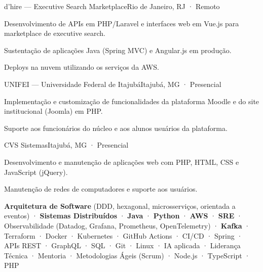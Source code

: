 \documentclass{resume}
\begin{document}
        {d'hire — Executive Search Marketplace}{Rio de Janeiro, RJ · Remoto}
\begin{cvitems}
  \item Desenvolvimento de APIs em PHP/Laravel e interfaces web em Vue.js para marketplace
        de executive search.
  \item Sustentação de aplicações Java (Spring MVC) e Angular.js em produção.
  \item Deploys na nuvem utilizando os serviços da AWS.
\end{cvitems}

        {UNIFEI — Universidade Federal de Itajubá}{Itajubá, MG · Presencial}
\begin{cvitems}
  \item Implementação e customização de funcionalidades da plataforma Moodle e do site
        institucional (Joomla) em PHP.
  \item Suporte aos funcionários do núcleo e aos alunos usuários da plataforma.
\end{cvitems}

        {CVS Sistemas}{Itajubá, MG · Presencial}
\begin{cvitems}
  \item Desenvolvimento e manutenção de aplicações web com PHP, HTML, CSS e JavaScript (jQuery).
  \item Manutenção de redes de computadores e suporte aos usuários.
\end{cvitems}


\textbf{Arquitetura de Software} (DDD, hexagonal, microsserviços, orientada a eventos) ·
\textbf{Sistemas Distribuídos} · \textbf{Java} · \textbf{Python} · \textbf{AWS} ·
\textbf{SRE} · Observabilidade (Datadog, Grafana, Prometheus, OpenTelemetry) · \textbf{Kafka} ·
Terraform · Docker · Kubernetes · GitHub Actions · CI/CD · Spring · APIs REST · GraphQL ·
SQL · Git · Linux · IA aplicada · Liderança Técnica · Mentoria · Metodologias Ágeis (Scrum) ·
Node.js · TypeScript · PHP


\par
{}
\par
{}
\par


\end{document}
